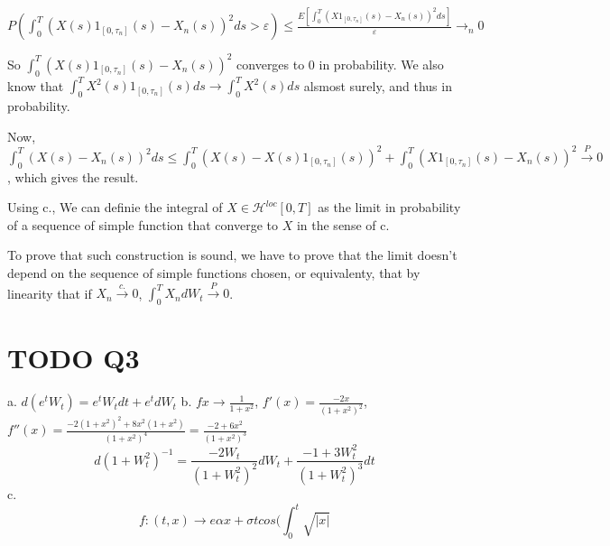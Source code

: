 \documentclass[11pt]{article}
\begin{document}
\(P(\int_0^T (X(s)1_{[0, \tau_n]}(s) - X_n(s))^2 ds > \varepsilon) \le \frac{E[\int_0^T (X1_{[0, \tau_n]}(s) - X_n(s))^2 ds]}{\varepsilon} \rightarrow_n 0\)

So \(\int_0^T (X(s)1_{[0, \tau_n]}(s) - X_n(s))^2\) converges to 0 in probability.
We also know that \(\int_0^T X^2(s)1_{[0, \tau_n]}(s) ds \rightarrow \int_0^T X^2(s) ds\) alsmost surely, and thus in probability.

Now, \(\int_0^T (X(s) - X_n(s))^2 ds \le \int_0^T (X(s) - X(s)1_{[0, \tau_n]}(s))^2 + \int_0^T (X1_{[0, \tau_n]}(s) - X_n(s))^2 \overset{P}{\rightarrow} 0\), which gives the result.

Using c., We can definie the integral of  \(X \in \mathcal H^{loc}[0, T]\) as the limit in probability of a sequence of simple function that converge to \(X\) in the sense of c.

To prove that such construction is sound, we have to prove that the limit doesn't depend on the sequence of simple functions chosen, or equivalenty, that by linearity that if \(X_n \overset{c.}{\rightarrow} 0\), \(\int_0^T X_n dW_t \overset{P}{\rightarrow} 0\).


\section{{\bfseries\sffamily TODO} Q3}
\label{sec:orgheadline4}
a. \(d(e^tW_t) = e^tW_t dt + e^tdW_t\)
b. \(f x \rightarrow \frac1{1+x^2}\), \(f'(x) = \frac{-2x}{(1+x^2)^2}\), \(f''(x) = \frac{-2(1+x^2)^2 + 8x^2(1+x^2)}{(1+x^2)^4} = \frac{-2 + 6x^2}{(1+x^2)^3}\)
$$d(1+W_t^2)^{-1} = \frac{-2W_t}{(1+W_t^2)^2}dW_t + \frac{-1 + 3W_t^2}{(1+W_t^2)^3}dt$$
c. $$f: (t, x) \rightarrow e{\alpha x + \sigma t} cos(\int_0^t \sqrt{|x|} $$
\end{document}
